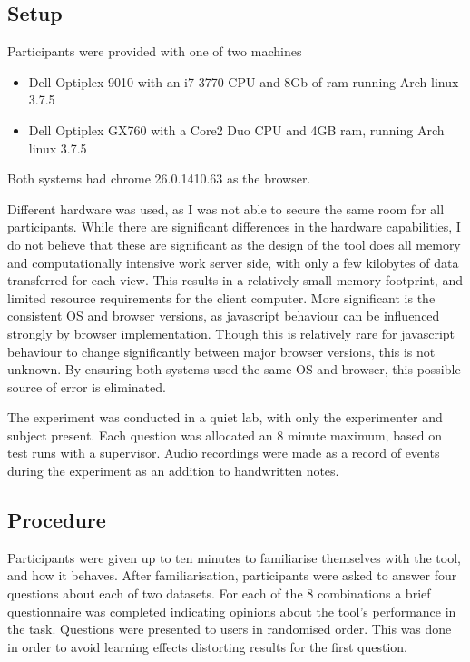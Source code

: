 \subsection{Setup}
Participants were provided with one of two machines
\begin{itemize}
\item{Dell Optiplex 9010 with an i7-3770 CPU and 8Gb of ram running Arch linux 3.7.5}
\item{Dell Optiplex GX760 with a Core2 Duo CPU and 4GB ram, running Arch linux 3.7.5}
\end{itemize}
Both systems had chrome 26.0.1410.63 as the browser.

Different hardware was used, as I was not able to secure the same room for all participants. 
While there are significant differences in the hardware capabilities, I do not believe that these are significant
as the design of the tool does all memory and computationally intensive work server side, with only a few kilobytes of data transferred for each view. This results in a relatively small memory footprint, and limited resource requirements for the client computer.
More significant is the consistent OS and browser versions, as javascript behaviour can be influenced strongly by browser implementation. Though this is relatively rare for javascript behaviour to change significantly between major browser versions, this is not unknown. By ensuring both systems used the same OS and browser, this possible source of error is eliminated.

The experiment was conducted in a quiet lab, with only the experimenter and subject present. Each question was allocated an 8 minute maximum, based on test runs with a supervisor. Audio recordings were made as a record of events during the experiment as an addition to handwritten notes. 

\subsection{Procedure}
Participants were given up to ten minutes to familiarise themselves with the tool, and how it behaves. After familiarisation, participants were asked to answer four questions about each of two datasets. For each of the 8 combinations a brief questionnaire was completed indicating opinions about the tool's performance in the task\cite{lewis1995ibm}.
Questions were presented to users in randomised order. This was done in order to avoid learning effects distorting results for the first question.

